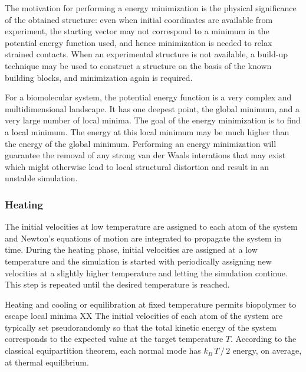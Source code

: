 The motivation for performing a energy minimization is the physical significance of the obtained structure: even when initial coordinates are available from experiment, the starting vector may not correspond to a minimum in the potential energy function used, and hence minimization is needed to relax strained contacts. When an experimental structure is not available, a build-up technique may be used to construct a structure on the basis of the known building blocks, and minimization again is required.

For a biomolecular system, the potential energy function is a very complex and multidimensional landscape. It has one deepest point, the global minimum, and a very large number of local minima. The goal of the energy minimization is to find a local minimum. The energy at this local minimum may be much higher than the energy of the global minimum. Performing an energy minimization will guarantee the removal of any strong van der Waals interations that may exist which might otherwise lead to local structural distortion and result in an unstable simulation.


\subsubsection{Heating}

The initial velocities at low temperature are assigned to each atom of the system and Newton's equations of motion are integrated to propagate the system in time. During the heating phase, initial velocities are assigned at a low temperature and the simulation is started with periodically assigning new velocities at a slightly higher temperature and letting the simulation continue. This step is repeated until the desired temperature is reached.

Heating and cooling or equilibration at fixed temperature permits biopolymer to escape local minima
XX
The initial velocities of each atom of the system are typically set pseudorandomly so that the total kinetic energy of the system corresponds to the expected value at the target temperature $T$. According to the classical equipartition theorem, each normal mode has $k_B \, T \,/\,2$ energy, on average, at thermal equilibrium.

